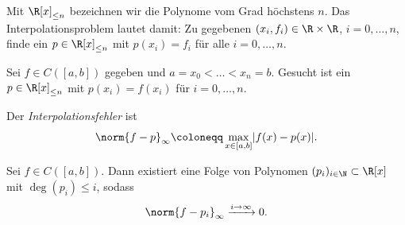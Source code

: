 \documentclass[11pt]{article}
\begin{document}
Mit $\R[x]_{\le n}$ bezeichnen wir die Polynome vom Grad höchstens $n$.
Das Interpolationsproblem lautet damit: Zu gegebenen $(x_i, f_i) \in \R \times \R$, $i = 0, \dots, n$, finde ein $p \in \R[x]_{\le n}$ mit $p(x_i) = f_i$ für alle $i = 0, \dots, n$.

\begin{definition}\Theorem
  Sei $f \in C([a, b])$ gegeben und $a = x_0 < \dots < x_n = b$.
  Gesucht ist ein $p \in \R[x]_{\le n}$ mit $p(x_i) = f(x_i)$ für $i = 0, \dots, n$.
\end{definition}


\begin{definition}[Interpolationsfehler]\Theorem
  Der \emph{Interpolationsfehler} ist
  \[ \norm{f - p}_{\infty} \coloneqq \max_{x \in [a, b]} \lvert f(x) - p(x) \rvert. \]
\end{definition}

\begin{theorem}\Theorem
  Sei $f \in C([a, b])$. Dann existiert eine Folge von Polynomen $(p_i)_{i \in \N} \subset \R[x]$ mit $\deg(p_i) \le i$, sodass
  \[ \norm{f - p_i}_{\infty} \xrightarrow{i \to \infty} 0. \]
\end{theorem}
\end{document}
